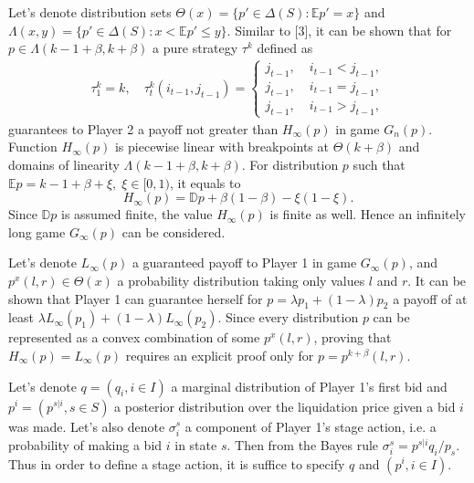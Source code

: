 Let's denote distribution sets $\Theta(x) = \{p' \in \Delta(S): \mathbb{E}p' =
x\}$ and $\Lambda(x, y) = \{p' \in \Delta(S): x < \mathbb{E}p' \leq y \}$.
Similar to [3], it can be shown that for $p \in \Lambda(k-1+\beta, k+\beta)$ a
pure strategy $\tau^k$ defined as
\begin{gather*}
  \tau_1^k = k, \quad \tau_t^k(i_{t-1}, j_{t-1}) =
  \begin{cases}
    j_{t-1}, &\; i_{t-1} < j_{t-1},\\
    j_{t-1}, &\; i_{t-1} = j_{t-1},\\
    j_{t-1}, &\; i_{t-1} > j_{t-1},
  \end{cases}
\end{gather*}
guarantees to Player 2 a payoff not greater than $H_\infty(p)$ in game $G_n(p)$.
Function $H_\infty(p)$ is piecewise linear with breakpoints at $\Theta(k+\beta)$
and domains of linearity $\Lambda(k-1+\beta, k+\beta)$. For distribution $p$
such that $\mathbb{E} p = k - 1 + \beta + \xi, \; \xi \in [0, 1)$, it equals to
\begin{equation*}
  H_\infty(p) = \mathbb{D} p + \beta(1-\beta) -\xi(1-\xi).
\end{equation*}
Since $\mathbb{D}p$ is assumed finite, the value $H_\infty(p)$ is finite as
well. Hence an infinitely long game $G_\infty(p)$ can be considered.

Let's denote $L_\infty(p)$ a guaranteed payoff to Player 1 in game
$G_\infty(p)$, and $p^x(l, r) \in \Theta(x)$ a probability distribution taking
only values $l$ and $r$. It can be shown that Player 1 can guarantee herself for
$p = \lambda p_1 + (1-\lambda) p_2$ a payoff of at least $\lambda L_\infty(p_1)
+ (1-\lambda) L_\infty(p_2)$. Since every distribution $p$ can be represented as
a convex combination of some $p^x(l,r)$, proving that $H_\infty(p) =
L_\infty(p)$ requires an explicit proof only for $p = p^{k+\beta}(l, r)$.

Let's denote $q = (q_i, i \in I)$ a marginal distribution of Player 1's first
bid and $p^i = (p^{s|i}, s \in S)$ a posterior distribution over the liquidation
price given a bid $i$ was made. Let's also denote $\sigma^s_i$ a component of
Player 1's stage action, i.e. a probability of making a bid $i$ in state $s$.
Then from the Bayes rule $\sigma^s_i = p^{s|i} q_i / p_s$. Thus in order to
define a stage action, it is suffice to specify $q$ and $(p^i, i \in I)$.


